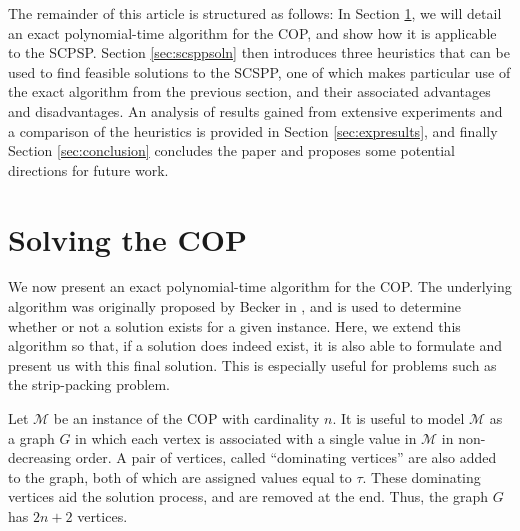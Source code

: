 \documentclass[runningheads]{llncs}
\begin{document}
\noindent The remainder of this article is structured as follows: In Section \ref{sec:ahc}, we will detail an exact polynomial-time algorithm for the COP, and show how it is applicable to the SCPSP. Section \ref{sec:scsppsoln} then introduces three heuristics that can be used to find feasible solutions to the SCSPP, one of which makes particular use of the exact algorithm from the previous section, and their associated advantages and disadvantages. An analysis of results gained from extensive experiments and a comparison of the heuristics is provided in Section \ref{sec:expresults}, and finally Section \ref{sec:conclusion} concludes the paper and proposes some potential directions for future work.

\section{Solving the COP}
\label{sec:ahc}
We now present an exact polynomial-time algorithm for the COP. The underlying algorithm was originally proposed by Becker in \cite{becker2010}, and is used to determine whether or not a solution exists for a given instance. Here, we extend this algorithm so that, if a solution does indeed exist, it is also able to formulate and present us with this final solution. This is especially useful for problems such as the strip-packing problem.

Let $\mathcal{M}$ be an instance of the COP with cardinality $n$. It is useful to model $\mathcal{M}$ as a graph $G$ in which each vertex is associated with a single value in $\mathcal{M}$ in non-decreasing order. A pair of vertices, called ``dominating vertices'' are also added to the graph, both of which are assigned values equal to $\tau$. These dominating vertices aid the solution process, and are removed at the end. Thus, the graph $G$ has $2n+2$ vertices.
\end{document}
